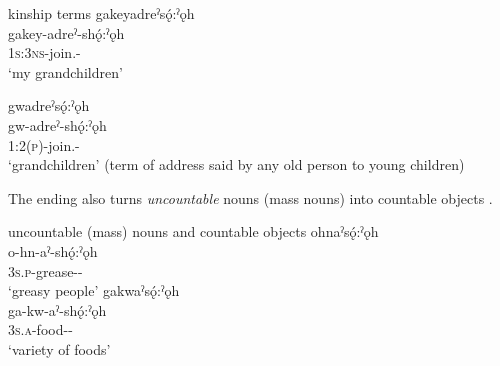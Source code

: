 \z
\z

\ea\label{ex:sooex20} kinship terms
\ea gakeyadreˀsǫ́:ˀǫh\\
\gll gakey-adreˀ-shǫ́:ˀǫh\\
 \textsc{1s:3ns}-join.{\stat}-{\pluralizer}\\
\glt `my grandchildren'

\ex gwadreˀsǫ́:ˀǫh\\
\gll gw-adreˀ-shǫ́:ˀǫh\\
\textsc{1:2(p)}-join.{\stat}-{\pluralizer}\\
\glt ‘grandchildren’ (term of address said by any old person to young children)

\z
\z

The  {\pluralizer} ending also turns \emph{uncountable} nouns (mass nouns) into countable objects .

\ea\label{ex:sooex2} uncountable (mass) nouns and countable objects 
\ea ohnaˀsǫ́:ˀǫh \\
\gll  o-hn-aˀ-shǫ́:ˀǫh \\
\textsc{3s.p}-grease-{\nsf}-{\pluralizer}\\
\glt ‘greasy people’ {\countable}
\ex gakwaˀsǫ́:ˀǫh \\ 
\gll ga-kw-aˀ-shǫ́:ˀǫh \\
\textsc{3s.a}-food-{\nsf}-{\pluralizer}\\
\glt ‘variety of foods’  {\countable}

